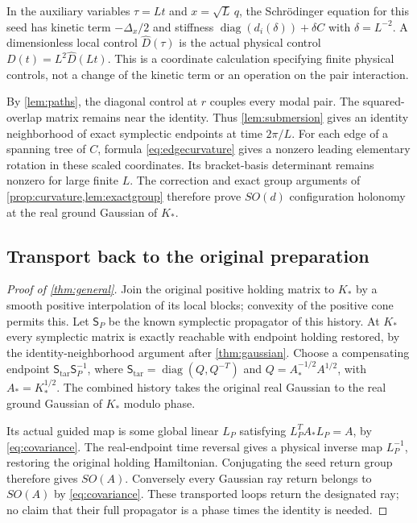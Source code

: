 \documentclass[11pt]{article}
\numberwithin{equation}{section}
\theoremstyle{definition}
\newcommand{\diag}{\operatorname{diag}}
\begin{document}
In the auxiliary variables $\tau=Lt$ and $x=\sqrt L\,q$, the
Schr\"odinger equation for this seed has kinetic term $-\Delta_x/2$
and stiffness $\diag(d_i(\delta))+\delta C$ with $\delta=L^{-2}$.
A dimensionless local control $\widehat D(\tau)$ is the actual
physical control $D(t)=L^2\widehat D(Lt)$.
This is a coordinate calculation specifying finite physical
controls, not a change of the kinetic term or an operation on
the pair interaction.

By \cref{lem:paths}, the diagonal control at $r$ couples every
modal pair. The squared-overlap matrix remains near the identity.
Thus \cref{lem:submersion} gives an identity neighborhood of
exact symplectic endpoints at time $2\pi/L$.
For each edge of a spanning tree of $C$, formula
\eqref{eq:edgecurvature} gives a nonzero leading elementary
rotation in these scaled coordinates. Its bracket-basis
determinant remains nonzero for large finite $L$.
The correction and exact group arguments of
\cref{prop:curvature,lem:exactgroup} therefore prove $SO(d)$
configuration holonomy at the real ground Gaussian of $K_*$.

\subsection{Transport back to the original preparation}

\begin{proof}[Proof of \cref{thm:general}]
Join the original positive holding matrix to $K_*$ by a smooth
positive interpolation of its local blocks; convexity of the
positive cone permits this. Let $\mathsf S_P$ be the known
symplectic propagator of this history.
At $K_*$ every symplectic matrix is exactly reachable with
endpoint holding restored, by the identity-neighborhood argument
after \cref{thm:gaussian}. Choose a compensating endpoint
$\mathsf S_{\mathrm{tar}}\mathsf S_P^{-1}$, where
$\mathsf S_{\mathrm{tar}}=\diag(Q,Q^{-T})$ and
$Q=A_*^{-1/2}A^{1/2}$, with $A_*=K_*^{1/2}$.
The combined history takes the original real Gaussian to the
real ground Gaussian of $K_*$ modulo phase.

Its actual guided map is some global linear $L_P$ satisfying
$L_P^TA_*L_P=A$, by \eqref{eq:covariance}.
The real-endpoint time reversal gives a physical inverse map
$L_P^{-1}$, restoring the original holding Hamiltonian.
Conjugating the seed return group therefore gives $SO(A)$.
Conversely every Gaussian ray return belongs to $SO(A)$ by
\eqref{eq:covariance}. These transported loops return the
designated ray; no claim that their full propagator is a phase
times the identity is needed.
\end{proof}
\end{document}
